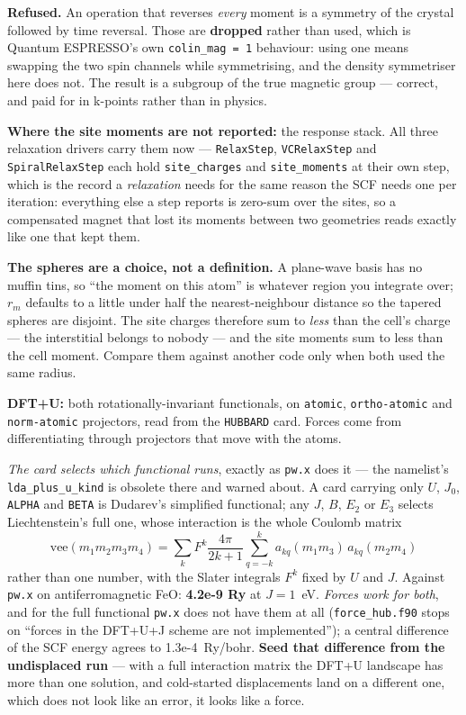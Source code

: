 \documentclass[11pt,a4paper]{article}
\newcommand{\qe}{Quantum ESPRESSO}
\newcommand{\code}[1]{\texttt{\small #1}}
\begin{document}
\begin{refuses}
\textbf{Refused.} An operation that reverses \emph{every} moment is a symmetry of
the crystal followed by time reversal. Those are \textbf{dropped} rather than
used, which is \qe{}'s own \code{colin\_mag = 1} behaviour: using one means
swapping the two spin channels while symmetrising, and the density symmetriser
here does not. The result is a subgroup of the true magnetic group --- correct,
and paid for in k-points rather than in physics.

\textbf{Where the site moments are not reported:} the response stack. All three
relaxation drivers carry them now --- \code{RelaxStep}, \code{VCRelaxStep} and
\code{SpiralRelaxStep} each hold \code{site\_charges} and \code{site\_moments} at
their own step, which is the record a \emph{relaxation} needs for the same reason
the SCF needs one per iteration: everything else a step reports is zero-sum over
the sites, so a compensated magnet that lost its moments between two geometries
reads exactly like one that kept them.

\textbf{The spheres are a choice, not a definition.} A plane-wave basis has no
muffin tins, so ``the moment on this atom'' is whatever region you integrate
over; $r_m$ defaults to a little under half the nearest-neighbour distance so the
tapered spheres are disjoint. The site charges therefore sum to \emph{less} than
the cell's charge --- the interstitial belongs to nobody --- and the site moments
sum to less than the cell moment. Compare them against another code only when
both used the same radius.
\end{refuses}

\textbf{DFT+U:} both rotationally-invariant functionals, on \code{atomic},
\code{ortho-atomic} and \code{norm-atomic} projectors, read from the
\code{HUBBARD} card. Forces come from differentiating through projectors that
move with the atoms.

\emph{The card selects which functional runs}, exactly as \code{pw.x} does it
--- the namelist's \code{lda\_plus\_u\_kind} is obsolete there and warned about.
A card carrying only $U$, $J_0$, \code{ALPHA} and \code{BETA} is Dudarev's
simplified functional; any $J$, $B$, $E_2$ or $E_3$ selects Liechtenstein's full
one, whose interaction is the whole Coulomb matrix
%
\[
  \mathrm{vee}(m_1 m_2 m_3 m_4)
  = \sum_{k} F^k \frac{4\pi}{2k+1}
    \sum_{q=-k}^{k} a_{kq}(m_1 m_3)\, a_{kq}(m_2 m_4)
\]
%
rather than one number, with the Slater integrals $F^k$ fixed by $U$ and $J$.
Against \code{pw.x} on antiferromagnetic FeO: \textbf{4.2e-9 Ry} at $J = 1$~eV.
\emph{Forces work for both}, and for the full functional \code{pw.x} does not
have them at all (\code{force\_hub.f90} stops on ``forces in the DFT+U+J scheme
are not implemented''); a central difference of the SCF energy agrees to
1.3e-4~Ry/bohr. \textbf{Seed that difference from the undisplaced run} --- with
a full interaction matrix the DFT+U landscape has more than one solution, and
cold-started displacements land on a different one, which does not look like an
error, it looks like a force.
\end{document}

